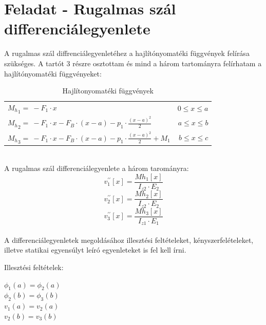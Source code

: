 \documentclass{article}
\begin{document}
	\newpage

	\section{Feladat - Rugalmas szál differenciálegyenlete}
		A rugalmas szál diffrenciálegyenletéhez a hajlítónyomatéki függvények felírása szükséges. A tartót 3 részre osztottam és mind a három tartományra felírhatam a hajlítónyomatéki függvényeket:
		\def\arraystretch{2}
		\begin{table}[h!]
			\begin{center}
				\caption{Hajlítonyomatéki függvények}
				\label{tab:table1}
				\begin{tabular}{l|r} %
					${M_h}_1=\ -F_1\cdot x$ & $0\le x\le a$\\
					${M_h}_2=\ -F_1\cdot x-F_B\cdot\left(x-a\right)-p_1\cdot\frac{\left(x-a\right)^2}{2}$ & $a\le x\le b$\\
					${M_h}_3=\ -F_1\cdot x-F_B\cdot\left(x-a\right)-p_1\cdot\frac{\left(x-a\right)^2}{2}+M_1$ & $b\le x\le c$
				\end{tabular}
			\end{center}
		\end{table}\\[10pt]
		\def\arraystretch{1}%
		A rugalmas szál differenciálegyenlete a három tarományra:
		\begin{equation}
			v_1^{\prime\prime}\left[x\right]=\frac{Mh_1\left[x\right]}{I_{z2}\cdot E_2}
		\end{equation}
		\begin{equation}
			v_2^{\prime\prime}\left[x\right]=\frac{Mh_2\left[x\right]}{I_{z2}\cdot E_2}
		\end{equation}
		\begin{equation}
			v_3^{\prime\prime}\left[x\right]=\frac{Mh_3\left[x\right]}{I_{z1}\cdot E_1}
		\end{equation}\\[10pt]
		A differenciálegyenletek megoldásához illesztési feltételeket, kényszerfelételeket, illetve statikai egyensúlyt leíró egyenleteket is fel kell írni.
		
		Illesztési feltételek:
		\begin{center}
			$\phi_1(a)=\phi_2(a)$\\
			$\phi_2(b)=\phi_3(b)$\\
			$v_1(a)=v_2(a)$\\
			$v_2(b)=v_3(b)$\\
		\end{center}
		
\end{document}
